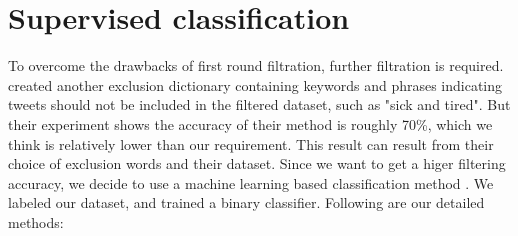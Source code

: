 \section{Supervised classification}
\label{sec:Supervised classification}
To overcome the drawbacks of first round filtration, further filtration is required. \cite{elkin2017network} created another exclusion dictionary containing keywords and phrases indicating tweets should not be included in the filtered dataset, such as "sick and tired". But their experiment shows the accuracy of their method is roughly 70\%, which we think is relatively lower than our requirement. This result can result from their choice of exclusion words and their dataset.  Since we want to get a higer filtering accuracy, we decide to use a machine learning based classification method \cite{aramaki2011twitter}. We labeled our dataset, and trained a binary classifier. Following are our detailed methods:
